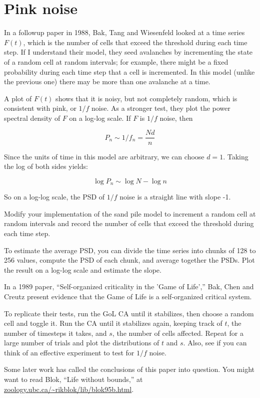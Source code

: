 \documentclass[10pt]{book}
\begin{document}
\section{Pink noise}

In a followup paper in 1988, Bak, Tang and Wiesenfeld looked
at a time series $F(t)$, which is the number of cells that
exceed the threshold during each time step.  If I understand
their model, they seed avalanches by incrementing the state
of a random cell at random intervals; for example, there might
be a fixed probability during each time step that a cell
is incremented.  In this model (unlike the previous one) there
may be more than one avalanche at a time.

A plot of $F(t)$ shows that it is noisy, but not completely
random, which is consistent with pink, or $1/f$ noise.
As a stronger test, they plot the power spectral density of
$F$ on a log-log scale.  If $F$ is $1/f$ noise, then

\[ P_n \sim 1 / f_n = \frac{N d}{n} \]

Since the units of time in this model are arbitrary, we
can choose $d=1$.  Taking the log of both sides yields:

\[ \log P_n \sim \log N - \log n \]

So on a log-log scale, the PSD of $1/f$ noise is a straight
line with slope -1.

\begin{ex}

Modify your implementation of the sand pile model to increment
a random cell at random intervals and record the number of cells
that exceed the threshold during each time step.

To estimate the average PSD, you can divide the time series into
chunks of 128 to 256 values, compute the PSD of each chunk, and
average together the PSDs.  Plot the result on a log-log scale
and estimate the slope.

\end{ex}


\begin{ex}

In a 1989 paper, ``Self-organized criticality in the 'Game of Life',''
Bak, Chen and Creutz present evidence that the Game of Life
is a self-organized critical system.

To replicate their tests, run the GoL CA until it stabilizes,
then choose a random cell and toggle it.  Run the CA until
it stabilizes again, keeping track of $t$, the number
of timesteps it takes, and $s$, the number of cells affected.
Repeat for a large number of trials and plot the distributions
of $t$ and $s$.  Also, see if you can think of an effective
experiment to test for $1/f$ noise.

Some later work has called the conclusions of this paper into
question.  You might want to read Blok, ``Life without bounds,''
at \url{zoology.ubc.ca/~rikblok/lib/blok95b.html}.

\end{ex}
\end{document}
